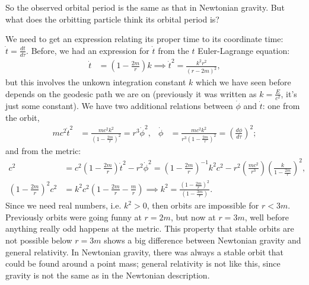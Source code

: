 \documentclass[a4paper, 11pt, normalem]{report}
\begin{document}
So the observed orbital period is the same as that in Newtonian gravity. 
But what does the orbitting particle think its orbital period is?
\begin{figure}[H]
    \centering
\end{figure}
We need to get an expression relating its proper time to its coordinate time: $\dot{t}=\frac{dt}{d\tau}$. 
Before, we had an expression for $\dot{t}$ from the $t$ Euler-Lagrange equation:
\begin{align}
    \dot{t} &= \left(1-\frac{2m}{r}\right)k \implies \dot{t}^2 = \frac{k^2r^2}{(r-2m)^2},
\end{align}
but this involves the unkown integration constant $k$ which we have seen before depends on the geodesic path we are on (previously it was written as $k=\frac{E}{c^2}$, it's just some constant).
We have two additional relations between $\dot{\phi}$ and $\dot{t}$: one from the orbit, 
\begin{align}
    mc^2\dot{t}^2 &= \frac{mc^2k^2}{\left(1-\frac{2m}{r}\right)^2} = r^3\dot{\phi}^2, & \dot{\phi} &= \frac{mc^2k^2}{r^3\left(1-\frac{2m}{r}\right)^2} = \left(\frac{d\phi}{d\tau}\right)^2;
\end{align}
and from the metric:
\begin{align}
        c^2 &= c^2\left(1-\frac{2m}{r}\right)\dot{t}^2 - r^2\dot{\phi}^2 = \left(1-\frac{2m}{r}\right)^{-1}k^2c^2-r^2\left(\frac{mc^2}{r^3}\right)\left(\frac{k}{1-\frac{2m}{r}}\right)^2,\\
    \left(1-\frac{2m}{r}\right)^2c^2 &= k^2c^2\left(1-\frac{2m}{r}-\frac{m}{r}\right) \implies k^2 = \frac{\left(1-\frac{2m}{r}\right)^2}{\left(1-\frac{3m}{r}\right)}. 
\end{align}
Since we need real numbers, i.e. $k^2>0$, then orbits are impossible for $r<3m$. 
Previously orbits were going funny at $r=2m$, but now at $r=3m$, well before anything really odd happens at the metric. 
This property that stable orbits are not possible below $r=3m$ shows a big difference between Newtonian gravity and general relativity. 
In Newtonian gravity, there was always a stable orbit that could be found around a point mass; general relativity is not like this, since gravity is not the same as in the Newtonian description. 
\end{document}
